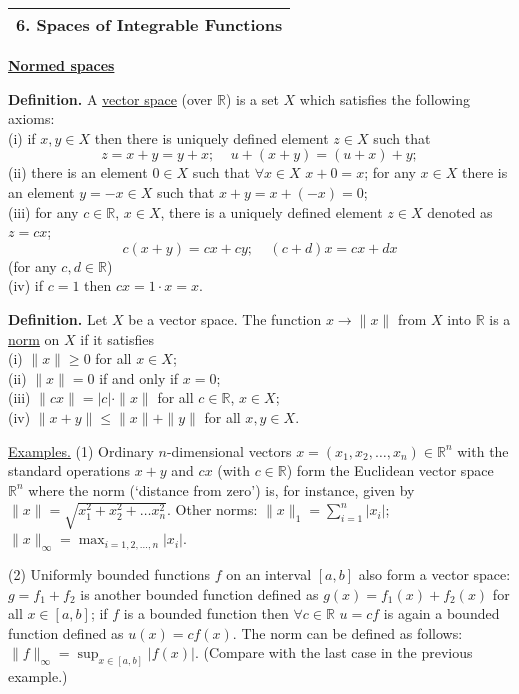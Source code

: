 \documentclass[a4paper,10pt]{article}
\def\RR{\mathbb{R}}
\newcommand{\1}[1]{\mathbf{1}_{\{#1\}}}
\begin{document}
\Large

\begin{tabular}{|l|}
\hline {\LARGE\bf 6. Spaces of Integrable Functions}\\
\hline\end{tabular}
\vspace{5mm}

\begin{center}\bf\underline{Normed spaces} \end{center}

{\bf Definition.} A \underline{vector space} (over $\RR$) is a set $X$ which satisfies the following axioms:\\
(i) if $x,y\in X$ then there is uniquely defined element $z\in X$ such that
  $$z=x+y=y+x;~~~~~u+(x+y)=(u+x)+y;$$
(ii) there is an element $0\in X$ such that $\forall x\in X$ $x+0=x$; for any $x\in X$ there is an element $y=-x\in X$ such that $x+y=x+(-x)=0$;\\
(iii) for any $c\in \RR$, $x\in X$, there is a uniquely defined element $z\in X$ denoted as $z=cx$;
  $$c(x+y)=cx+cy;~~~~~(c+d)x=cx+dx$$
(for any $c,d\in\RR$)\\
(iv) if $c=1$ then $cx=1\cdot x=x$.\vspace{5mm}

{\bf Definition.} Let $X$ be a vector space. The function $x\to \|x\|$ from $X$ into $\RR$ is a \underline{norm} on $X$ if it satisfies\\
(i) $\|x\|\ge 0$ for all $x\in X$;\\
(ii) $\|x\|=0$ if and only if $x=0$;\\
(iii) $\|cx\|=|c|\cdot\|x\|$ for all $c\in\RR$, $x\in X$;\\
(iv) $\|x+y\|\le \|x\|+\|y\|$ for all $x,y\in X$.\vspace{3mm}

\underline{Examples.} (1) Ordinary $n$-dimensional vectors $x=(x_1,x_2,\ldots,x_n)\in\RR^n$ with the standard operations $x+y$ and $cx$ (with $c\in\RR$) form the Euclidean vector space $\RR^n$ where the norm (`distance from zero') is, for instance, given by $\|x\|=\sqrt{x_1^2+x_2^2+\ldots x_n^2}$. Other norms: $\|x\|_1=\sum_{i=1}^n|x_i|$; $\|x\|_\infty=\max_{i=1,2,\ldots,n} |x_i|$.

(2) Uniformly bounded functions $f$ on an interval $[a,b]$ also form a vector space: $g=f_1+f_2$ is another bounded function defined as $g(x)=f_1(x)+f_2(x)$ for all $x\in[a,b]$; if $f$ is a bounded function then $\forall c\in \RR$ $u=cf$ is again a bounded function defined as $u(x)=cf(x)$. The norm can be defined as follows: $\|f\|_\infty =\sup_{x\in[a,b]}|f(x)|$. (Compare with the last case in the previous example.)\vspace{3mm}
\end{document}
